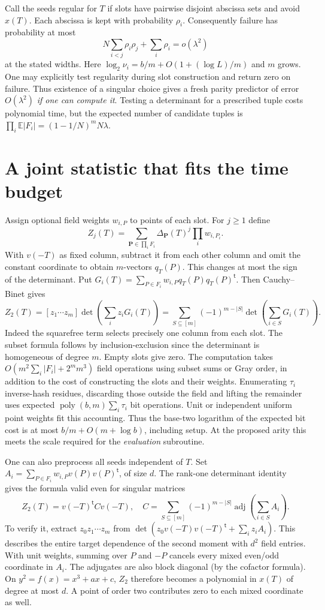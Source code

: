 \documentclass[11pt]{article}
\newcommand{\E}{\mathbb E}
\begin{document}
Call the seeds regular for $T$ if slots have pairwise disjoint abscissa sets
and avoid $x(T)$. Each abscissa is kept with probability $\rho_i$.
Consequently failure has probability at most
\[
 N\sum_{i<j}\rho_i\rho_j+\sum_i\rho_i=o(\lambda^2)
\]
at the stated widths. Here $\log_2\nu_i=b/m+O(1+(\log L)/m)$ and $m$ grows.
One may explicitly test regularity during slot construction and return zero
on failure. Thus existence of a singular choice gives a fresh parity
predictor of error $O(\lambda^2)$ \emph{if one can compute it}.
Testing a determinant for a prescribed tuple costs polynomial time, but
the expected number of candidate tuples is
$\prod_i\E|F_i|=(1-1/N)^m N\lambda$.

\section{A joint statistic that fits the time budget}

Assign optional field weights $w_{i,P}$ to points of each slot. For $j\ge1$
define
\[
 Z_j(T)=\sum_{\mathbf P\in\prod_i F_i}
       \Delta_{\mathbf P}(T)^j\prod_i w_{i,P_i}.
\]
With $v(-T)$ as fixed column, subtract it from each other column and omit
the constant coordinate to obtain $m$-vectors $q_T(P)$. This changes at
most the sign of the determinant. Put
$G_i(T)=\sum_{P\in F_i}w_{i,P}q_T(P)q_T(P)^{\mathsf t}$.
Then Cauchy--Binet gives
\[
 Z_2(T)=[z_1\cdots z_m]\det\left(\sum_i z_i G_i(T)\right)
 =\sum_{S\subseteq[m]}(-1)^{m-|S|}\det\left(\sum_{i\in S}G_i(T)\right).
\]
Indeed the squarefree term selects precisely one column from each slot.
The subset formula follows by inclusion-exclusion since the determinant is
homogeneous of degree $m$. Empty slots give zero. The computation takes
$O(m^2\sum_i |F_i|+2^m m^3)$ field operations using subset sums or Gray
order, in addition to the cost of constructing the slots and their weights.
Enumerating $\tau_i$ inverse-hash residues, discarding those outside the
field and lifting the remainder uses expected $\operatorname{poly}(b,m)
\sum_i\tau_i$ bit operations. Unit or independent uniform point weights
fit this accounting. Thus the base-two logarithm of the expected bit cost
is at most $b/m+O(m+\log b)$, including setup. At the proposed arity
this meets the scale required for the \emph{evaluation} subroutine.

One can also preprocess all seeds independent of $T$. Set
$A_i=\sum_{P\in F_i} w_{i,P}v(P)v(P)^{\mathsf t}$, of size $d$.
The rank-one determinant identity gives the formula valid even for singular
matrices
\[
 Z_2(T)=v(-T)^{\mathsf t} C v(-T),\quad
 C=\sum_{S\subseteq[m]}(-1)^{m-|S|}
             \operatorname{adj}\left(\sum_{i\in S}A_i\right).
\]
To verify it, extract $z_0 z_1\cdots z_m$ from
$\det(z_0 v(-T)v(-T)^{\mathsf t}+\sum_i z_i A_i)$.
This describes the entire target dependence of the second moment with
$d^2$ field entries. With unit weights, summing over $P$ and $-P$
cancels every mixed even/odd coordinate in $A_i$. The adjugates are also
block diagonal (by the cofactor formula). On $y^2=f(x)=x^3+ax+c$,
$Z_2$ therefore becomes a polynomial in $x(T)$ of degree at most $d$.
A point of order two contributes zero to each mixed coordinate as well.
\end{document}
